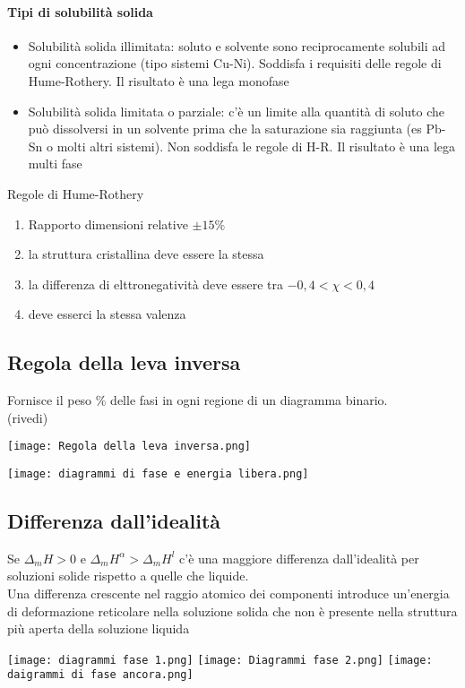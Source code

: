 \documentclass{article}
\begin{document}
\paragraph{Tipi di solubilità solida}

\begin{itemize}
    \item Solubilità solida illimitata: soluto e solvente sono reciprocamente solubili ad ogni concentrazione (tipo sistemi Cu-Ni). Soddisfa i requisiti delle regole di Hume-Rothery. Il risultato è una lega monofase
    \item Solubilità solida limitata o parziale: c'è un limite alla quantità di soluto che può dissolversi in un solvente prima che la saturazione sia raggiunta (es Pb-Sn o molti altri sistemi). Non soddisfa le regole di H-R. Il risultato è una lega multi fase
\end{itemize}
Regole di Hume-Rothery
\begin{enumerate}
    \item Rapporto dimensioni relative $\pm 15\%$
    \item la struttura cristallina deve essere la stessa
    \item la differenza di elttronegatività deve essere tra $-0,4<\chi<0,4$
    \item deve esserci la stessa valenza
\end{enumerate}

\subsection{Regola della leva inversa}
Fornisce il peso $\%$ delle fasi in ogni regione di un diagramma binario. \\
(rivedi)
\begin{center}
    \texttt{[image: Regola della leva inversa.png]}
\end{center}
\begin{center}
    \texttt{[image: diagrammi di fase e energia libera.png]}
\end{center}

\subsection{Differenza dall'idealità}
Se $\Delta_mH>0$ e $\Delta_mH^\alpha>\Delta_mH^l$ c'è una maggiore differenza dall'idealità per soluzioni solide rispetto a quelle che liquide. \\
Una differenza crescente nel raggio atomico dei componenti introduce un'energia di deformazione reticolare nella soluzione solida che non è presente nella struttura più aperta della soluzione liquida
\begin{center}
    \texttt{[image: diagrammi fase 1.png]}
    \texttt{[image: Diagrammi fase 2.png]}
    \texttt{[image: daigrammi di fase ancora.png]}
\end{center}
\end{document}

